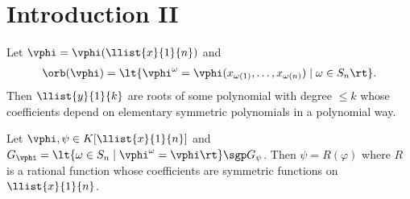 \documentclass{article}
\begin{document}
\section{Introduction II}
\begin{ttheorem}[Lagrange]
  Let \( \vphi=\vphi(\llist{x}{1}{n}) \) and \begin{align*}
    \orb(\vphi) = \lt\{ \vphi^\omega = \vphi(x_{\omega(1)},\ldots,x_{\omega(n)}) \mid\omega\in S_n \rt\}.
  \end{align*}
  Then \( \llist{y}{1}{k} \) are roots of some polynomial with degree \( \leq k \) whose coefficients depend on elementary symmetric polynomials  in a polynomial way.
\end{ttheorem}

\begin{ttheorem}[Lagrange]
  Let \( \vphi,\psi\in K[\llist{x}{1}{n}] \) and \( G_\vphi=\lt\{ \omega\in S_n \mid \vphi^\omega=\vphi \rt\} \sgp G_\psi \).
  Then \( \psi = R(\varphi) \) where \( R \) is a rational function whose coefficients are symmetric functions on \( \llist{x}{1}{n} \).
\end{ttheorem}



\end{document}
